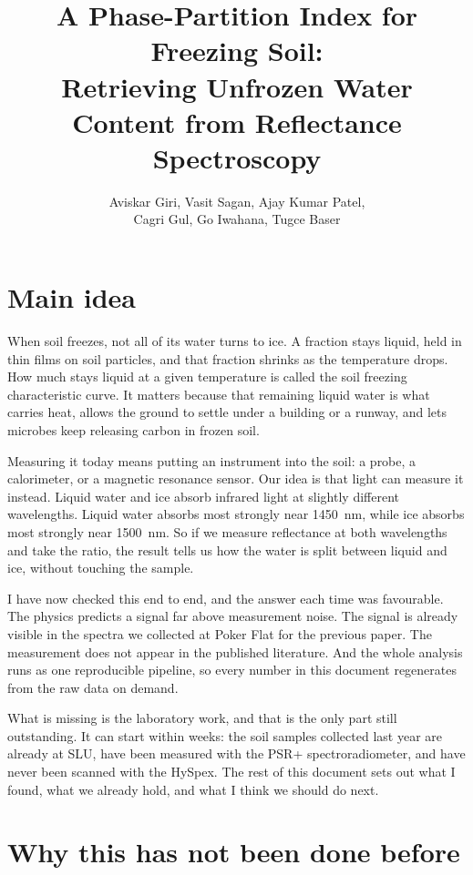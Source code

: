 \documentclass[11pt]{article}
\title{\vspace{-1.5em}\textbf{A Phase-Partition Index for Freezing Soil:\\
Retrieving Unfrozen Water Content from Reflectance Spectroscopy}}
\author{Aviskar Giri, Vasit Sagan, Ajay Kumar Patel,\\
Cagri Gul, Go Iwahana, Tugce Baser}
\begin{document}
\maketitle
\vspace{-1em}

\section{Main idea}

When soil freezes, not all of its water turns to ice. A fraction stays liquid,
held in thin films on soil particles, and that fraction shrinks as the
temperature drops. How much stays liquid at a given temperature is called the
soil freezing characteristic curve. It matters because that remaining liquid
water is what carries heat, allows the ground to settle under a building or a
runway, and lets microbes keep releasing carbon in frozen soil.

Measuring it today means putting an instrument into the soil: a probe, a
calorimeter, or a magnetic resonance sensor. Our idea is that light can measure
it instead. Liquid water and ice absorb infrared light at slightly different
wavelengths. Liquid water absorbs most strongly near \SI{1450}{\nano\meter},
while ice absorbs most strongly near \SI{1500}{\nano\meter}. So if we measure
reflectance at both wavelengths and take the ratio, the result tells us how the
water is split between liquid and ice, without touching the sample.

I have now checked this end to end, and the answer each time was favourable. The
physics predicts a signal far above measurement noise. The signal is already
visible in the spectra we collected at Poker Flat for the previous paper. The
measurement does not appear in the published literature. And the whole analysis
runs as one reproducible pipeline, so every number in this document regenerates
from the raw data on demand.

What is missing is the laboratory work, and that is the only part still
outstanding. It can start within weeks: the soil samples collected last year are
already at SLU, have been measured with the PSR+ spectroradiometer, and have
never been scanned with the HySpex. The rest of this document sets out what I
found, what we already hold, and what I think we should do next.

\section{Why this has not been done before}
\end{document}
